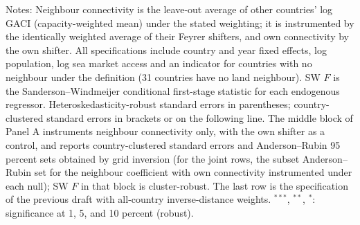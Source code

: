 \begin{table}[htbp]
\begin{threeparttable}
\begin{tablenotes}[flushleft]
\item Notes: Neighbour connectivity is the leave-out average of other countries' log GACI (capacity-weighted mean) under the stated weighting; it is instrumented by the identically weighted average of their Feyrer shifters, and own connectivity by the own shifter. All specifications include country and year fixed effects, log population, log sea market access and an indicator for countries with no neighbour under the definition (31 countries have no land neighbour). SW $F$ is the Sanderson--Windmeijer conditional first-stage statistic for each endogenous regressor. Heteroskedasticity-robust standard errors in parentheses; country-clustered standard errors in brackets or on the following line. The middle block of Panel A instruments neighbour connectivity only, with the own shifter as a control, and reports country-clustered standard errors and Anderson--Rubin 95 percent sets obtained by grid inversion (for the joint rows, the subset Anderson--Rubin set for the neighbour coefficient with own connectivity instrumented under each null); SW $F$ in that block is cluster-robust. The last row is the specification of the previous draft with all-country inverse-distance weights. $^{***}$, $^{**}$, $^{*}$: significance at 1, 5, and 10 percent (robust).
\end{tablenotes}
\end{threeparttable}
\end{table}

